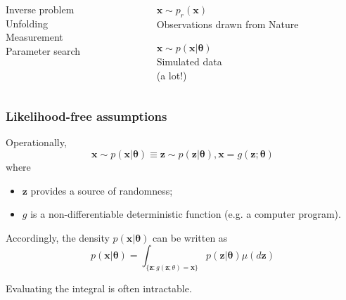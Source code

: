 \documentclass{beamer}
\newcommand{\bftheta}{{\bm \theta}}
\newcommand{\bfx}{\mathbf{x}}
\newcommand{\bfz}{\mathbf{z}}
\begin{document}
\begin{frame}
\begin{columns}
\begin{column}{0.4\textwidth}
            Inverse problem\\
            Unfolding\\
            Measurement\\
            Parameter search

        \end{column}
        \begin{column}{0.35\textwidth}
            \centering

            {\Large $\bfx \sim p_r(\bfx)$}\\
            Observations drawn from Nature

            \vspace{1cm}

            {\Large $\bfx \sim p(\bfx|\bftheta)$}\\
            Simulated data \\
            (a lot!)
        \end{column}
    \end{columns}

\end{frame}

\begin{frame}
    \frametitle{Likelihood-free assumptions}

    Operationally,
    $$\bfx \sim p(\bfx | \bftheta) \equiv \bfz \sim p(\bfz | \bftheta), \bfx = g(\bfz; \bftheta)$$
    where
    \begin{itemize}
        \item $\bfz$ provides a source of randomness;
        \item $g$ is a non-differentiable deterministic function (e.g. a computer program).
    \end{itemize}

    \vspace{0.5cm}

    Accordingly, the density $p(\bfx | \bftheta)$ can be written as
    $$p(\bfx | \bftheta) = \int_{\{ \bfz : g(\bfz; \theta) = \bfx \} } p(\bfz | \bftheta) \mu(d\bfz) $$

    \vspace{0.5cm}

    Evaluating the integral is often {\color{red} intractable}.
\end{frame}
\end{document}
